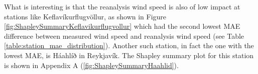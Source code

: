 What is interesting is that the reanalysis wind speed is also of low impact at stations like Keflavíkurflugvöllur, as shown in Figure \ref{fig:ShapleySummaryKeflavikurflugvollur} which had the second lowest MAE difference between measured wind speed and reanalysis wind speed (see Table \ref{table:station_mae_distribution}). Another such station, in fact the one with the lowest MAE, is Háahlíð in Reykjavík. The Shapley summary plot for this station is shown in Appendix A (\ref{fig:ShapleySummaryHaahlid}).
